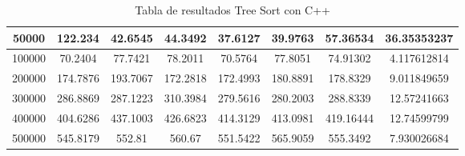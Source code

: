 \documentclass{article}
\begin{document}
\begin{table}[]
\begin{tabular}{|c|c|c|c|c|c|c|c| }
            50000   & 122.234	&   42.6545 &	44.3492  &  37.6127  & 39.9763 & 57.36534 & 36.35353237 \\ \hline
            100000  & 70.2404	&   77.7421 &	78.2011  &  70.5764  & 77.8051 & 74.91302 & 4.117612814 \\ \hline
            200000   & 174.7876&	193.7067&	172.2818 &	172.4993 & 180.8891& 178.8329 & 9.011849659 \\ \hline
            300000   & 286.8869&	287.1223&	310.3984 &	279.5616 & 280.2003& 288.8339 & 12.57241663 \\ \hline
            400000   & 404.6286&	437.1003&	426.6823 &	414.3129 & 413.0981& 419.16444& 12.74599799 \\ \hline
            500000   & 545.8179&	552.81  &	560.67   &	551.5422 & 565.9059& 555.3492 & 7.930026684 \\ \hline
            \end{tabular}
            \caption{Tabla de resultados Tree Sort con C++}
        \label{tab:treeSortC}
    \end{table}
\end{document}
